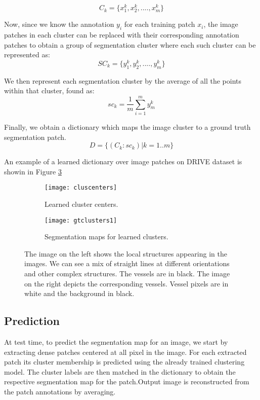$$
C_k = \{x^k_1,x^k_2,....,x^k_m\}
$$

Now, since we know the annotation $y_i$ for each training patch $x_i$, the image patches in each cluster can be replaced with their corresponding annotation patches to obtain a group of segmentation cluster where each such cluster can be represented as:
$$
SC_k = \{y^k_1,y^k_2,....,y^k_m\}
$$

We then represent each segmentation cluster by the average of all the points within that cluster, found as:
$$	
sc_k = \frac{1}{m}\sum\limits_{i=1}^{m} y^k_m
$$

Finally, we obtain a dictionary which maps the image cluster to a ground truth segmentation patch.
$$
D = \{ (C_k : sc_k) | k =1..m\}
$$

An example of a learned dictionary over image patches on DRIVE dataset is showin in Figure \ref{fig:cb-cls}
\begin{figure}
	\begin{subfigure}[b]{0.45\textwidth}
		\texttt{[image: cluscenters]}
		\caption{Learned cluster centers.}
		\label{fig:cluscenters}
	\end{subfigure}
	\begin{subfigure}[b]{0.45\textwidth}
		\texttt{[image: gtclusters1]}
		\caption{Segmentation maps for learned clusters.}
		\label{fig:gtclusters}
	\end{subfigure}
	\caption[Local structures learned using clustering and their segmentation maps]{The image on the left shows the local structures appearing in the images. We can see a mix of straight lines at different orientations and other complex structures. The vessels are in black. The image on the right depicts the corresponding vessels. Vessel pixels are in white and the background in black.}
	\label{fig:cb-cls}
\end{figure}

\subsection{Prediction}
At test time, to predict the segmentation map for an image, we start by extracting dense patches centered at all pixel in the image. For each extracted patch its cluster membership is predicted using the already trained clustering model. The cluster labels are then matched in the dictionary to obtain the respective segmentation map for the patch.Output image is reconstructed from the patch annotations by averaging. 

